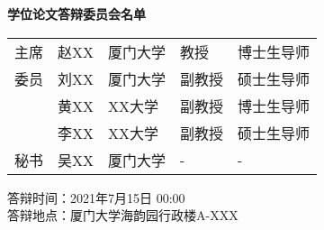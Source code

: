 \begin{center}
    {\bfseries \heiti {} 学位论文答辩委员会名单}
\end{center}

\vskip 20pt
\noindent
{
    \songti
    \begin{tabularx}{\textwidth} { XXX
        >{\centering\arraybackslash}X
        >{\centering\arraybackslash}X  }
      主席 & 赵XX & 厦门大学 & 教授 & 博士生导师 \\
   
      委员& 刘XX & 厦门大学 & 副教授 & 硕士生导师 \\
      &  黄XX &  XX大学& 副教授 &  博士生导师\\
      &  李XX &  XX大学& 副教授 &  硕士生导师\\
      秘书& 吴XX & 厦门大学 & - & - 
   \end{tabularx}

}

\vspace{5ex}

{   
    \noindent
    答辩时间：2021年7月15日 00:00
    \\
    \noindent
    答辩地点：厦门大学海韵园行政楼A-XXX   
}